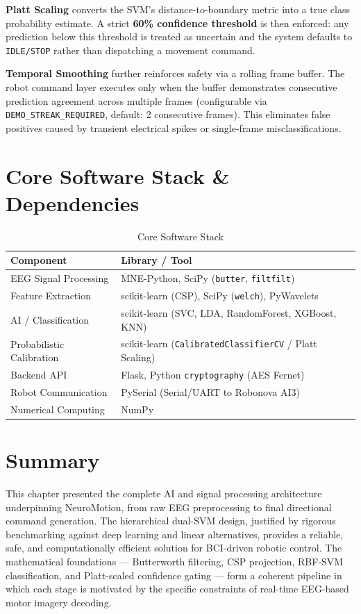 \documentclass[12pt, a4paper, oneside]{report}
\begin{document}
\textbf{Platt Scaling} converts the SVM's distance-to-boundary metric into a true class
probability estimate. A strict \textbf{60\% confidence threshold} is then enforced:
any prediction below this threshold is treated as uncertain and the system defaults to
\texttt{IDLE/STOP} rather than dispatching a movement command.

\textbf{Temporal Smoothing} further reinforces safety via a rolling frame buffer. The
robot command layer executes only when the buffer demonstrates consecutive prediction
agreement across multiple frames (configurable via \texttt{DEMO\_STREAK\_REQUIRED},
default: 2 consecutive frames). This eliminates false positives caused by transient
electrical spikes or single-frame misclassifications.

\section{Core Software Stack \& Dependencies}

\begin{table}[h]
\centering
\caption{Core Software Stack}
\label{tab:software_stack}
\begin{tabular}{ll}
\toprule
\textbf{Component} & \textbf{Library / Tool} \\
\midrule
EEG Signal Processing    & MNE-Python, SciPy (\texttt{butter}, \texttt{filtfilt}) \\
Feature Extraction       & scikit-learn (CSP), SciPy (\texttt{welch}), PyWavelets \\
AI / Classification      & scikit-learn (SVC, LDA, RandomForest, XGBoost, KNN) \\
Probabilistic Calibration & scikit-learn (\texttt{CalibratedClassifierCV} / Platt Scaling) \\
Backend API              & Flask, Python \texttt{cryptography} (AES Fernet) \\
Robot Communication      & PySerial (Serial/UART to Robonova AI3) \\
Numerical Computing      & NumPy \\
\bottomrule
\end{tabular}
\end{table}

\section{Summary}

This chapter presented the complete AI and signal processing architecture underpinning
NeuroMotion, from raw EEG preprocessing to final directional command generation. The
hierarchical dual-SVM design, justified by rigorous benchmarking against deep learning
and linear alternatives, provides a reliable, safe, and computationally efficient solution
for BCI-driven robotic control. The mathematical foundations --- Butterworth filtering,
CSP projection, RBF-SVM classification, and Platt-scaled confidence gating --- form a
coherent pipeline in which each stage is motivated by the specific constraints of
real-time EEG-based motor imagery decoding.
\end{document}

